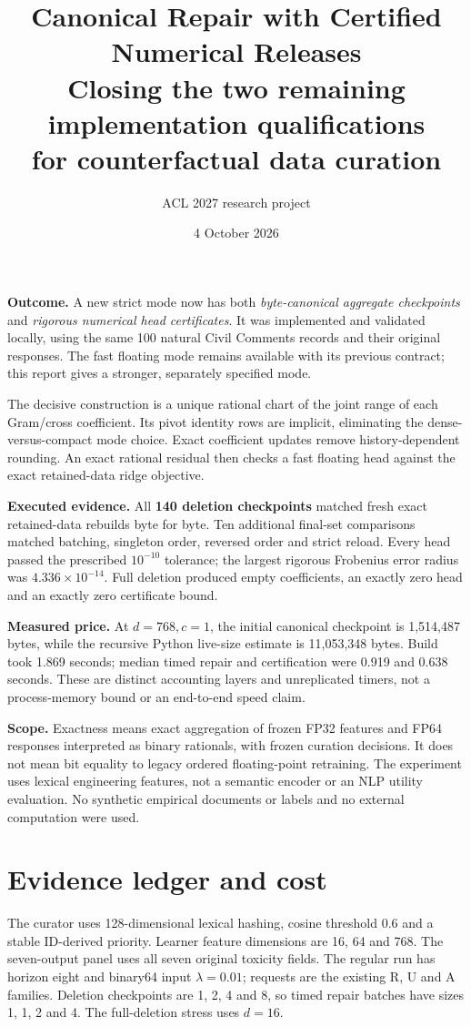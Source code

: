 \documentclass[11pt,a4paper]{article}
\title{\color{ink}\textbf{Canonical Repair with Certified Numerical Releases}\\[5pt]
\Large Closing the two remaining implementation qualifications\\for counterfactual data curation}
\author{ACL 2027 research project}
\date{4 October 2026}
\begin{document}
\maketitle

\textbf{Outcome.} A new strict mode now has both \emph{byte-canonical aggregate
checkpoints} and \emph{rigorous numerical head certificates}. It was implemented
and validated locally, using the same 100 natural Civil Comments records and
their original responses. The fast floating mode remains available with its
previous contract; this report gives a stronger, separately specified mode.

The decisive construction is a unique rational chart of the joint range of
each Gram/cross coefficient. Its pivot identity rows are implicit, eliminating
the dense-versus-compact mode choice. Exact coefficient updates remove
history-dependent rounding. An exact rational residual then checks a fast
floating head against the exact retained-data ridge objective.

\textbf{Executed evidence.} All \textbf{140 deletion checkpoints} matched fresh
exact retained-data rebuilds byte for byte. Ten additional final-set comparisons
matched batching, singleton order, reversed order and strict reload. Every
head passed the prescribed $10^{-10}$ tolerance; the largest rigorous
Frobenius error radius was $4.336\times10^{-14}$. Full deletion produced empty coefficients,
an exactly zero head and an exactly zero certificate bound.

\textbf{Measured price.} At $d=768,c=1$, the initial canonical checkpoint is
1,514,487 bytes, while the recursive Python live-size estimate is 11,053,348
bytes. Build took 1.869 seconds; median timed repair and certification were
0.919 and 0.638 seconds. These are distinct accounting layers and unreplicated
timers, not a process-memory bound or an end-to-end speed claim.

\textbf{Scope.} Exactness means exact aggregation of frozen FP32 features and
FP64 responses interpreted as binary rationals, with frozen curation decisions.
It does not mean bit equality to legacy ordered floating-point retraining.
The experiment uses lexical engineering features, not a semantic encoder or
an NLP utility evaluation. No synthetic empirical documents or labels and no
external computation were used.
\newpage

\section*{Evidence ledger and cost}
The curator uses 128-dimensional lexical hashing, cosine threshold 0.6 and
a stable ID-derived priority. Learner feature dimensions are 16, 64 and 768.
The seven-output panel uses all seven original toxicity fields. The regular
run has horizon eight and binary64 input $\lambda=0.01$; requests are the
existing R, U and A families. Deletion checkpoints are 1, 2, 4 and 8, so timed
repair batches have sizes 1, 1, 2 and 4. The full-deletion stress uses $d=16$.
\end{document}
